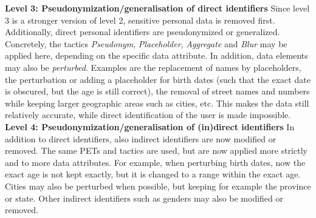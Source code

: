 \noindent \textbf{Level 3: Pseudonymization/generalisation of direct identifiers} Since level 3 is a stronger version of level 2, sensitive personal data is removed first. Additionally, direct personal identifiers are pseudonymized or generalized. Concretely, the tactics \textit{Pseudonym}, \textit{Placeholder}, \textit{Aggregate} and \textit{Blur} may be applied here, depending on the specific data attribute. In addition, data elements may also be \textit{perturbed}. Examples are the replacement of names by placeholders, the perturbation or adding a placeholder for birth dates (such that the exact date is obscured, but the age is still correct), the removal of street names and numbers while keeping larger geographic areas such as cities, etc. This makes the data still relatively accurate, while direct identification of the user is made impossible.\\

\noindent \textbf{Level 4: Pseudonymization/generalisation of (in)direct identifiers} In addition to direct identifiers, also indirect identifiers are now modified or removed. The same \gls{PETs} and tactics are used, but are now applied more strictly and to more data attributes. For example, when perturbing birth dates, now the exact age is not kept exactly, but it is changed to a range within the exact age. Cities may also be perturbed when possible, but keeping for example the province or state. Other indirect identifiers such as genders may also be modified or removed.


